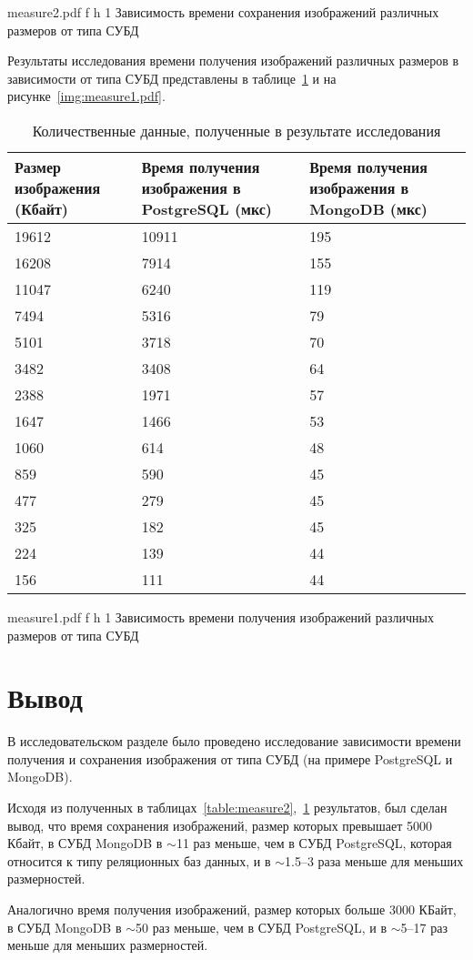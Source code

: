 \clearpage

	{measure2.pdf}
	{f}
	{h}
	{1\textwidth}
	{Зависимость времени сохранения изображений различных размеров от типа СУБД}

Результаты исследования времени получения изображений различных размеров в зависимости от типа СУБД представлены в таблице~\ref{table:measure1} и на рисунке~\ref{img:measure1.pdf}.
\begin{table}[!ht]
	\centering
	\caption{\label{table:measure1} Количественные данные, полученные в результате исследования}
	\begin{tabularx}{\textwidth}{|X|X|X|}
		\hline
		Размер изображения (Кбайт) & Время получения изображения в PostgreSQL (мкс) & Время получения изображения в MongoDB (мкс) \\ \hline
      	19612 & 10911 & 195 \\ \hline
		16208 & 7914 & 155 \\ \hline
		11047 & 6240 & 119 \\ \hline
		7494 & 5316 & 79 \\ \hline
		5101 & 3718 & 70 \\ \hline
		3482 & 3408 & 64 \\ \hline
		2388 & 1971 & 57 \\ \hline
		1647 & 1466 & 53 \\ \hline
		1060 & 614 & 48 \\ \hline
		859 & 590 & 45 \\ \hline
		477 & 279 & 45 \\ \hline
		325 & 182 & 45 \\ \hline
		224 & 139 & 44 \\ \hline
		156 & 111 & 44 \\ \hline
	\end{tabularx}
\end{table}

	{measure1.pdf}
	{f}
	{h}
	{1\textwidth}
	{Зависимость времени получения изображений различных размеров от типа СУБД}

\clearpage

\section{Вывод}

В исследовательском разделе было проведено исследование зависимости времени получения и сохранения изображения от типа СУБД (на примере PostgreSQL и MongoDB).

Исходя из полученных в таблицах~\ref{table:measure2},~\ref{table:measure1} результатов, был сделан вывод, что время сохранения изображений, размер которых превышает 5000 Кбайт, в СУБД MongoDB в $\sim$11 раз меньше, чем в СУБД PostgreSQL, которая относится к типу реляционных баз данных, и в $\sim$1.5--3 раза меньше для меньших размерностей.

Аналогично время получения изображений, размер которых больше 3000 КБайт, в СУБД MongoDB в $\sim$50 раз меньше, чем в СУБД PostgreSQL, и в $\sim$5--17 раз меньше для меньших размерностей.


